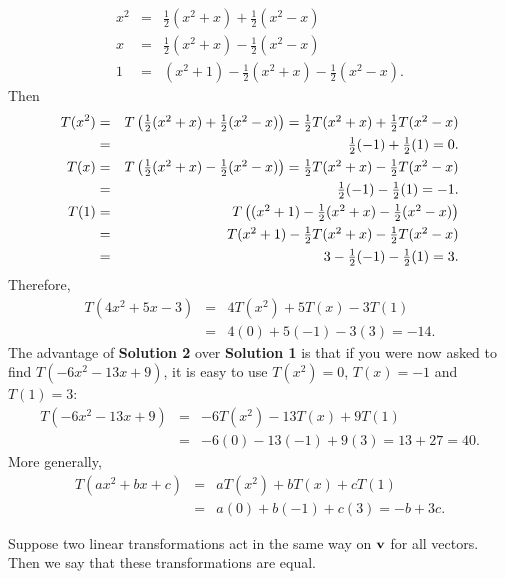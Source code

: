 \begin{solution}
  \begin{eqnarray*}
    x^2 & = & \textstyle \frac{1}{2}(x^2+x) + \frac{1}{2}(x^2-x) \\
    x & = & \textstyle \frac{1}{2}(x^2+x) - \frac{1}{2}(x^2-x) \\
    1 & = & (x^2+1)-\textstyle \frac{1}{2}(x^2+x) - \frac{1}{2}(x^2-x).
  \end{eqnarray*}
  Then
  \begin{eqnarray*}
    T(x^2)
    & = & \textstyle T\left(\frac{1}{2}(x^2+x) + \frac{1}{2}(x^2-x)\right)
          =\frac{1}{2}T(x^2+x) + \frac{1}{2}T(x^2-x)\\
    & = & \textstyle \frac{1}{2}(-1) + \frac{1}{2}(1) = 0.  \\
    T(x)
    & = & \textstyle T\left(\frac{1}{2}(x^2+x) - \frac{1}{2}(x^2-x)\right)
          = \frac{1}{2}T(x^2+x) - \frac{1}{2}T(x^2-x) \\
    & = & \textstyle \frac{1}{2}(-1) - \frac{1}{2}(1) = -1.\\
    T(1)
    & = & \textstyle T\left((x^2+1)-\frac{1}{2}(x^2+x) -
          \frac{1}{2}(x^2-x)\right)\\
    & = & \textstyle T(x^2+1)-\frac{1}{2}T(x^2+x) - \frac{1}{2}T(x^2-x) \\
    & = & \textstyle 3-\frac{1}{2}(-1) - \frac{1}{2}(1) = 3.
  \end{eqnarray*}
  Therefore,
  \begin{eqnarray*}
    T(4x^2+5x-3) & = & 4T(x^2) + 5T(x) -3T(1) \\
                 & = & 4(0) + 5(-1) - 3(3)=-14.
  \end{eqnarray*}
  The advantage of \textbf{Solution 2} over \textbf{Solution 1} is
  that if you were now asked to find $T(-6x^2-13x+9)$, it is easy to
  use $T(x^2)=0$, $T(x)=-1$ and $T(1)= 3$:
  \begin{eqnarray*}
    T(-6x^2-13x+9) & = & -6T(x^2)-13T(x)+9T(1) \\
                   & = & -6(0)-13(-1)+9(3)=13+27=40.
  \end{eqnarray*}
  More generally,
  \begin{eqnarray*}
    T(ax^2+bx+c) & = & aT(x^2)+bT(x)+cT(1) \\
                 & = & a(0)+b(-1)+c(3)=-b+3c.
  \end{eqnarray*}
\end{solution}

Suppose two linear transformations act in the same way on $\mbox{\bf v}$
for all vectors. Then we say that these transformations are equal.

